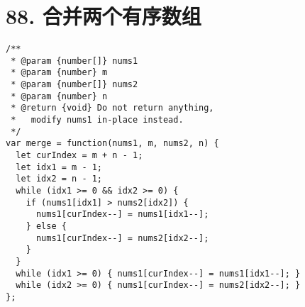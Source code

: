 \newpage
\section{88. 合并两个有序数组}
\label{leetcode:88}

\begin{verbatim}
/**
 * @param {number[]} nums1
 * @param {number} m
 * @param {number[]} nums2
 * @param {number} n
 * @return {void} Do not return anything, 
 *   modify nums1 in-place instead.
 */
var merge = function(nums1, m, nums2, n) {
  let curIndex = m + n - 1;
  let idx1 = m - 1;
  let idx2 = n - 1;
  while (idx1 >= 0 && idx2 >= 0) {
    if (nums1[idx1] > nums2[idx2]) {
      nums1[curIndex--] = nums1[idx1--];
    } else {
      nums1[curIndex--] = nums2[idx2--];
    }
  }
  while (idx1 >= 0) { nums1[curIndex--] = nums1[idx1--]; }
  while (idx2 >= 0) { nums1[curIndex--] = nums2[idx2--]; }
};
\end{verbatim}
